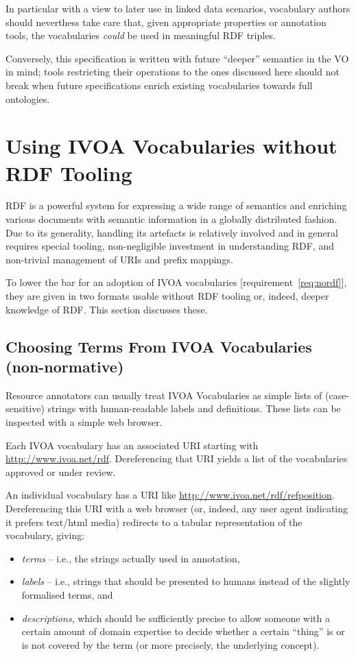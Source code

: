 \documentclass[11pt,a4paper]{ivoa}
\begin{document}
In particular with a view to later use in linked data scenarios,
vocabulary authors should neverthess take care that, given appropriate
properties or annotation tools, the vocabularies \emph{could} be used in
meaningful RDF triples.

Conversely, this specification is written with future ``deeper''
semantics in the VO in mind; tools restricting their operations to the ones
discussed here should not break when future specifications enrich
existing vocabularies towards full ontologies.


\section{Using IVOA Vocabularies without RDF Tooling}
\label{sect:withoutrdf}

RDF is a
powerful system for expressing a wide range of semantics and enriching
various documents with semantic information in a globally distributed
fashion.  Due to its generality, handling its artefacts is relatively
involved and in general requires special tooling, non-negligible
investment in understanding RDF, and non-trivial management of URIs and
prefix mappings.

To lower the bar for an adoption of IVOA vocabularies
[requirement~\ref{req:nordf}], they are given in
two formats usable without RDF tooling or, indeed, deeper knowledge of
RDF.  This section discusses these.

\subsection{Choosing Terms From IVOA Vocabularies (non-normative)}

Resource annotators can usually treat IVOA Vocabularies as simple lists
of (case-sensitive) strings with human-readable labels and definitions.  
These lists can be inspected with a simple web browser.

Each IVOA vocabulary has an associated URI starting with
\url{http://www.ivoa.net/rdf}.  Dereferencing that URI yields a list of
the vocabularies approved or under review.  

An individual vocabulary has a
URI like \url{http://www.ivoa.net/rdf/refposition}.  Dereferencing this URI
with a web browser (or, indeed, any user agent indicating it prefers
text/html media) redirects to a tabular representation of the vocabulary,
giving: 
\begin{itemize}
	\item \emph{terms} -- i.e., the strings actually used in annotation,
	\item \emph{labels} -- i.e., strings that should be presented to humans instead of
the slightly formalised terms, and 
    \item \emph{descriptions}, which should
be sufficiently precise to allow someone with a certain amount
of domain expertise to decide whether a certain ``thing'' is or is not
covered by the term (or more precisely, the underlying concept).
\end{itemize}
\end{document}
